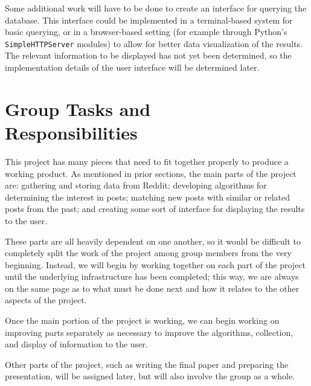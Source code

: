 \documentclass{acm_proc_article-sp}
\begin{document}
\balancecolumns

Some additional work will have to be done to create an interface for querying the database.  This
interface could be implemented in a terminal-based system for basic querying, or in a
browser-based setting (for example through Python's \texttt{SimpleHTTPServer} modules) to allow
for better data visualization of the results.  The relevant information to be displayed has not
yet been determined, so the implementation details of the user interface will be determined later.


\section{Group Tasks and \\Responsibilities}

This project has many pieces that need to fit together properly to produce a working product.
As mentioned in prior sections, the main parts of the project are: gathering and storing data
from Reddit; developing algorithms for determining the interest in posts; matching new posts
with similar or related posts from the past; and creating some sort of interface for
displaying the results to the user.

These parts are all heavily dependent on one another, so it would be difficult to completely
split the work of the project among group members from the very beginning.  Instead, we will
begin by working together on each part of the project until the underlying infrastructure
has been completed; this way, we are always on the same page as to what must be done next
and how it relates to the other aspects of the project.

Once the main portion of the project is working, we can begin working on improving parts
separately as necessary to improve the algorithms, collection, and display of information
to the user.

Other parts of the project, such as writing the final paper and preparing the presentation,
will be assigned later, but will also involve the group as a whole.


%

%
%


\end{document}
